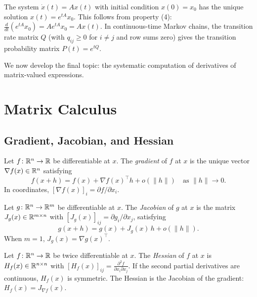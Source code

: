 \documentclass[11pt,a4paper]{article}
\begin{document}
\begin{example}
\label{ex:ode_solution}
The system $\dot{x}(t) = Ax(t)$ with initial condition $x(0) = x_0$
has the unique solution $x(t) = e^{tA} x_0$.  This follows from
property (4): $\frac{d}{dt}(e^{tA}x_0) = Ae^{tA}x_0 = Ax(t)$.
In continuous-time Markov chains, the transition rate matrix $Q$
(with $q_{ij} \geq 0$ for $i \neq j$ and row sums zero) gives the
transition probability matrix $P(t) = e^{tQ}$.
\end{example}

We now develop the final topic: the systematic computation of
derivatives of matrix-valued expressions.

\section{Matrix Calculus}
\label{sec:matrix_calculus}

\subsection{Gradient, Jacobian, and Hessian}

\begin{definition}[Gradient]
\label{def:gradient}
Let $f\colon \mathbb{R}^n \to \mathbb{R}$ be differentiable at $x$.  The
\emph{gradient} of $f$ at $x$ is the unique vector
$\nabla f(x) \in \mathbb{R}^n$ satisfying
\[
  f(x + h) = f(x) + \nabla f(x)^\top h + o(\|h\|)
  \quad \text{as } \|h\| \to 0.
\]
In coordinates, $[\nabla f(x)]_i = \partial f / \partial x_i$.
\end{definition}

\begin{definition}[Jacobian]
\label{def:jacobian}
Let $g\colon \mathbb{R}^n \to \mathbb{R}^m$ be differentiable at $x$.  The
\emph{Jacobian} of $g$ at $x$ is the matrix $J_g(x) \in \mathbb{R}^{m \times n}$
with $[J_g(x)]_{ij} = \partial g_i / \partial x_j$, satisfying
\[
  g(x + h) = g(x) + J_g(x)\, h + o(\|h\|).
\]
When $m = 1$, $J_g(x) = \nabla g(x)^\top$.
\end{definition}

\begin{definition}[Hessian]
\label{def:hessian}
Let $f\colon \mathbb{R}^n \to \mathbb{R}$ be twice differentiable at $x$.  The
\emph{Hessian} of $f$ at $x$ is $H_f(x) \in \mathbb{R}^{n \times n}$ with
$[H_f(x)]_{ij} = \frac{\partial^2 f}{\partial x_i \partial x_j}$.
If the second partial derivatives are continuous, $H_f(x)$ is symmetric.
The Hessian is the Jacobian of the gradient: $H_f(x) = J_{\nabla f}(x)$.
\end{definition}
\end{document}
